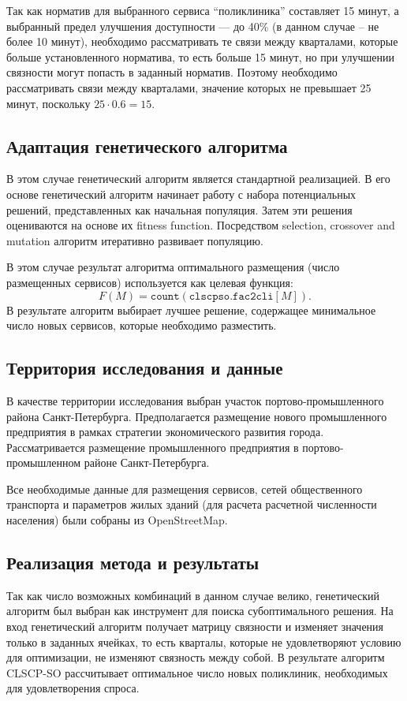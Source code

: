 \documentclass[14pt,a4paper]{extarticle}
\begin{document}
Так как норматив для выбранного сервиса ``поликлиника'' составляет 15 минут, а выбранный предел улучшения доступности --- до 40\% (в данном случае -- не более 10 минут), необходимо рассматривать те связи между кварталами, которые больше установленного норматива, то есть больше 15 минут, но при улучшении связности могут попасть в заданный норматив. Поэтому необходимо рассматривать связи между кварталами, значение которых не превышает 25 минут, поскольку \(25 \cdot 0.6 = 15\).

\subsection*{Адаптация генетического алгоритма}

В этом случае генетический алгоритм является стандартной реализацией. В его основе генетический алгоритм начинает работу с набора потенциальных решений, представленных как начальная популяция. Затем эти решения оцениваются на основе их fitness function. Посредством selection, crossover and mutation алгоритм итеративно развивает популяцию.

В этом случае результат алгоритма оптимального размещения (число размещенных сервисов) используется как целевая функция:
\[
F(M)=\texttt{count}(\texttt{clscpso.fac2cli}[M]).
\]
В результате алгоритм выбирает лучшее решение, содержащее минимальное число новых сервисов, которые необходимо разместить.

\subsection*{Территория исследования и данные}

В качестве территории исследования выбран участок портово-промышленного района Санкт-Петербурга. Предполагается размещение нового промышленного предприятия в рамках стратегии экономического развития города. Рассматривается размещение промышленного предприятия в портово-промышленном районе Санкт-Петербурга.

Все необходимые данные для размещения сервисов, сетей общественного транспорта и параметров жилых зданий (для расчета расчетной численности населения) были собраны из OpenStreetMap.

\subsection*{Реализация метода и результаты}

Так как число возможных комбинаций в данном случае велико, генетический алгоритм был выбран как инструмент для поиска субоптимального решения. На вход генетический алгоритм получает матрицу связности и изменяет значения только в заданных ячейках, то есть кварталы, которые не удовлетворяют условию для оптимизации, не изменяют связность между собой. В результате алгоритм CLSCP-SO рассчитывает оптимальное число новых поликлиник, необходимых для удовлетворения спроса.
\end{document}
